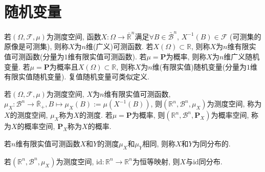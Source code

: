 \chapter{随机变量}

\begin{definition}
    若$(\Omega,\mathcal{F},\mu)$为测度空间, 函数$X\colon \Omega\to\bar{\mathbb{R}}^n$满足$\forall B \in \bar{\mathscr{B}}^n$, $X^{-1}(B)\in\mathcal{F}$ (可测集的原像是可测集), 则称$X$为$n$维(广义)可测函数. 若$X(\Omega)\subset \mathbb{R}$, 则称$X$为$n$维有限实值可测函数(分量为$1$维有限实值可测函数). 若$\mu=\mathbf{P}$为概率, 则称$X$为$n$维广义随机变量. 若$\mu=\mathbf{P}$为概率且$X(\Omega)\subset \mathbb{R}$, 则称$X$为$n$维(有限实值)随机变量(分量为$1$维有限实值随机变量). 复值随机变量可类似定义.
\end{definition}

\begin{definition}
    若$(\Omega,\mathcal{F},\mu)$为测度空间, $X$为$n$维有限实值可测函数, $\mu_X\colon {\mathscr{B}}^n\to \bar{\mathbb{R}}_+,B\mapsto\mu_X(B):=\mu(X^{-1}(B))$, 则$(\mathbb{R}^n,{\mathscr{B}}^n,\mu_X)$为测度空间, 称为$X$的测度空间, $\mu_X$称为$X$的测度. 若$\mu=\mathbf{P}$为概率, 则$(\mathbb{R}^n,{\mathscr{B}}^n,\mathbf{P}_X)$为概率空间, 称为$X$的概率空间, $\mathbf{P}_X$称为$X$的概率.
\end{definition}

\begin{definition}
    若$n$维有限实值可测函数$X$和$Y$的测度$\mu_X$和$\mu_Y$相同, 则称$X$和$Y$为同分布的.
\end{definition}

\begin{theorem}
    若$(\mathbb{R}^n,{\mathscr{B}}^n,\mu_X)$为测度空间, $\text{id}\colon \mathbb{R}^n\to{\mathbb{R} }^n$为恒等映射, 则$X$与$\text{id}$同分布.
\end{theorem}
